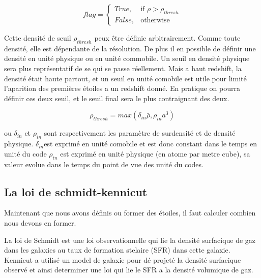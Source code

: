 \begin{equation}
	flag = 
  \begin{cases}
      True, & \text{if } \rho > \rho_{thresh}\\
      False,              & \text{otherwise}
  \end{cases}
\end{equation} 

Cette densité de seuil $\rho_{thresh}$ peux être définie arbitrairement.
Comme toute densité, elle est dépendante de la résolution.
De plus il en possible de définir une densité en unité physique ou en unité commobile.
Un seuil en densité physique sera plus représentatif de se qui se passe réellement.
Mais a haut redshift, la densité était haute partout, et un seuil en unité comobile est utile pour limité l'aparition des premières étoiles a un redshift donné.
En pratique on pourra définir ces deux seuil, et le seuil final sera le plus contraignant des deux.

\begin{equation}
	\rho_{thresh} = max\left(  \delta_{in} \bar{\rho}, \rho_{in} a^3 \right)
\end{equation} 

ou $\delta_{in}$ et $\rho_{in}$  sont respectivement les paramètre de surdensité et de densité physique.
$\delta_{in}$est exprimé en unité comobile et est donc constant dans le temps en unité du code
 $\rho_{in}$ est exprimé en unité physique (en atome par metre cube), sa valeur evolue dans le temps du point de vue des unité du codes.




\subsection{La loi de schmidt-kennicut}

Maintenant que nous avons définis ou former des étoiles, il faut calculer combien nous devons en former.

La loi de Schmidt %
est une loi observationnelle qui lie la densité surfacique de gaz dans les galaxies au taux de formation stelaire (SFR) dans cette galaxie.
Kennicut %
a utilisé un model de galaxie pour dé projeté la densité surfacique observé et ainsi determiner une loi qui lie le SFR a la densité volumique de gaz.


